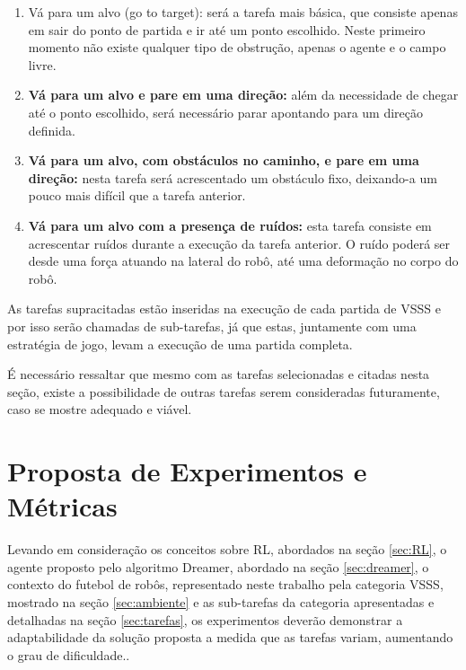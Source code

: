 \begin{enumerate}
\item Vá para um alvo (go to target): será a tarefa mais básica, que consiste apenas em sair do ponto de partida e ir até um ponto escolhido. Neste primeiro momento não existe qualquer tipo de obstrução, apenas o agente e o campo livre.

\item \textbf{Vá para um alvo e pare em uma direção:} além da necessidade de chegar até o ponto escolhido, será necessário parar apontando para um direção definida.

\item \textbf{Vá para um alvo, com obstáculos no caminho, e pare em uma direção:} nesta tarefa será acrescentado um obstáculo fixo, deixando-a um pouco mais difícil que a tarefa anterior.

\item \textbf{Vá para um alvo com a presença de ruídos:} esta tarefa consiste em acrescentar ruídos durante a execução da tarefa anterior. O ruído poderá ser desde uma força atuando na lateral do robô, até uma deformação no corpo do robô.
\end{enumerate}

As tarefas supracitadas estão inseridas na execução de cada partida de VSSS e por isso serão chamadas de sub-tarefas, já que estas, juntamente com uma estratégia de jogo, levam a execução de uma partida completa.

É necessário ressaltar que mesmo com as tarefas selecionadas e citadas nesta seção, existe a possibilidade de outras tarefas serem consideradas futuramente, caso se mostre adequado e viável.

\section{Proposta de Experimentos e Métricas}
\label{sec:experimentos_metricas}


Levando em consideração os conceitos sobre RL, abordados na seção \ref{sec:RL}, o agente proposto pelo algoritmo Dreamer, abordado na seção \ref{sec:dreamer}, o contexto do futebol de robôs, representado neste trabalho pela categoria VSSS, mostrado na seção \ref{sec:ambiente} e as sub-tarefas da categoria apresentadas e detalhadas na seção \ref{sec:tarefas}, os experimentos deverão demonstrar a adaptabilidade da solução proposta a medida que as tarefas variam, aumentando o grau de dificuldade.. 

